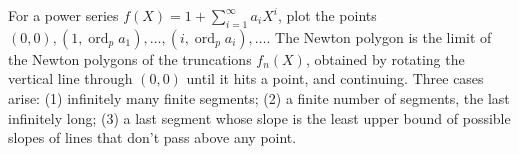 For a power series $f(X) = 1 + \sum_{i=1}^\infty a_i X^i$, plot the points $(0,0), (1,\operatorname{ord}_p a_1), \ldots, (i,\operatorname{ord}_p a_i), \ldots$. The Newton polygon is the limit of the Newton polygons of the truncations $f_n(X)$, obtained by rotating the vertical line through $(0,0)$ until it hits a point, and continuing. Three cases arise: (1) infinitely many finite segments; (2) a finite number of segments, the last infinitely long; (3) a last segment whose slope is the least upper bound of possible slopes of lines that don't pass above any point.